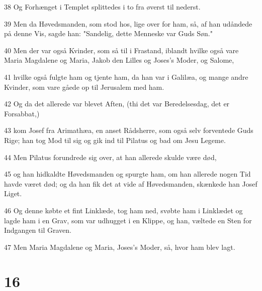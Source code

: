 \par 38 Og Forhænget i Templet splittedes i to fra øverst til nederst.
\par 39 Men da Høvedsmanden, som stod hos, lige over for ham, så, af han udåndede på denne Vis, sagde han: "Sandelig, dette Menneske var Guds Søn."
\par 40 Men der var også Kvinder, som så til i Frastand, iblandt hvilke også vare Maria Magdalene og Maria, Jakob den Lilles og Joses's Moder, og Salome,
\par 41 hvilke også fulgte ham og tjente ham, da han var i Galilæa, og mange andre Kvinder, som vare gåede op til Jerusalem med ham.
\par 42 Og da det allerede var blevet Aften, (thi det var Beredelsesdag, det er Forsabbat,)
\par 43 kom Josef fra Arimathæa, en anset Rådsherre, som også selv forventede Guds Rige; han tog Mod til sig og gik ind til Pilatus og bad om Jesu Legeme.
\par 44 Men Pilatus forundrede sig over, at han allerede skulde være død,
\par 45 og han hidkaldte Høvedsmanden og spurgte ham, om han allerede nogen Tid havde været død; og da han fik det at vide af Høvedsmanden, skænkede han Josef Liget.
\par 46 Og denne købte et fint Linklæde, tog ham ned, svøbte ham i Linklædet og lagde ham i en Grav, som var udhugget i en Klippe, og han, væltede en Sten for Indgangen til Graven.
\par 47 Men Maria Magdalene og Maria, Joses's Moder, så, hvor ham blev lagt.

\chapter{16}

